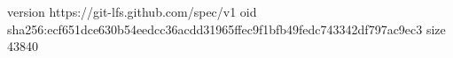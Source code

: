 version https://git-lfs.github.com/spec/v1
oid sha256:ecf651dce630b54eedcc36acdd31965ffec9f1bfb49fedc743342df797ac9ec3
size 43840
